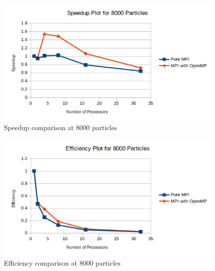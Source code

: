 \documentclass{article}
\begin{document}
\begin{figure}[H]
	\begin{center}
		\hspace*{-0.5cm}                                                           
  		\includegraphics[scale=0.7]{Report_Assets/speedup8000.png}
  	\end{center}
  	\caption{Speedup comparison at 8000 particles}
\end{figure}

\begin{figure}[H]
	\begin{center}
		\hspace*{-0.5cm}                                                           
  		\includegraphics[scale=0.7]{Report_Assets/efficiency8000.png}
  	\end{center}
  	\caption{Efficiency comparison at 8000 particles}
\end{figure}
\end{document}
